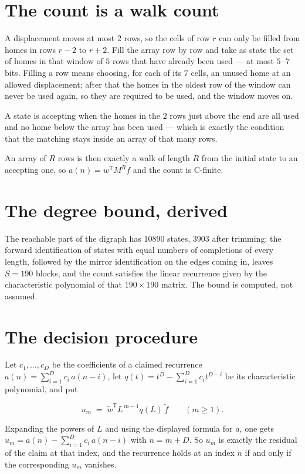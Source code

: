 \documentclass[11pt]{article}
\theoremstyle{definition}
\begin{document}
\section{The count is a walk count}

A displacement moves at most $2$ rows, so the cells of row $r$ can only be filled from homes in rows $r-2$ to $r+2$. Fill the array row by row and take as state the set of homes in that window of $5$ rows that have already been used --- at most $5\cdot7$ bits. Filling a row means choosing, for each of its $7$ cells, an unused home at an allowed displacement; after that the homes in the oldest row of the window can never be used again, so they are required to be used, and the window moves on.

A state is accepting when the homes in the $2$ rows just above the end are all used and no home below the array has been used --- which is exactly the condition that the matching stays inside an array of that many rows.

An array of $R$ rows is then exactly a walk of length $R$ from the initial state to an accepting one, so $a(n) = w^{\mathsf T}M^{R}f$ and the count is C-finite.

\section{The degree bound, derived}

The reachable part of the digraph has $10890$ states, $3903$ after trimming; the forward identification of states with equal numbers of completions of every length, followed by the mirror identification on the edges coming in, leaves $S = 190$ blocks, and the count satisfies the linear recurrence given by the characteristic polynomial of that $190\times190$ matrix. The bound is computed, not assumed.

\section{The decision procedure}

Let $c_1,\dots,c_D$ be the coefficients of a claimed recurrence $a(n) = \sum_{i=1}^{D} c_i\,a(n-i)$, let $q(t) = t^{D} - \sum_{i=1}^{D} c_i t^{D-i}$ be its characteristic polynomial, and put

\[u_m \;=\; \tilde w^{\mathsf T} L^{\,m-1} q(L)\,\tilde f \qquad (m \ge 1).\]

Expanding the powers of $L$ and using the displayed formula for $a$, one gets $u_m = a(n) - \sum_{i=1}^{D} c_i\,a(n-i)$ with $n = m + D$. So $u_m$ is exactly the residual of the claim at that index, and the recurrence holds at an index $n$ if and only if the corresponding $u_m$ vanishes.
\end{document}
